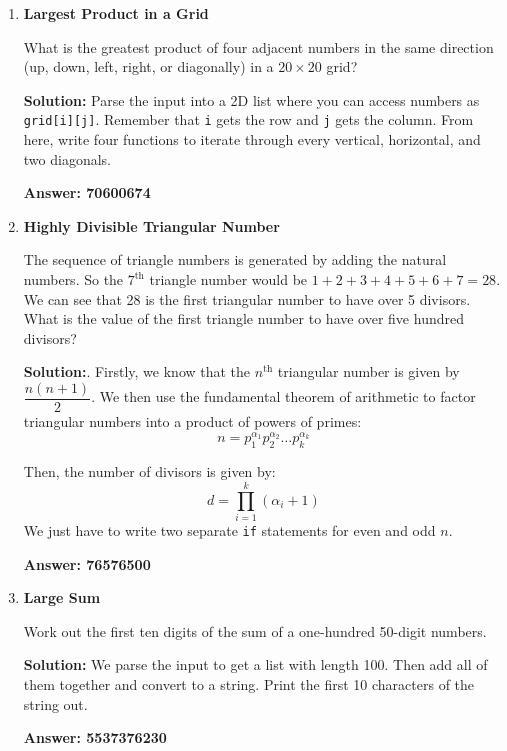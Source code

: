 \documentclass[12pt]{article}
\begin{document}
\begin{enumerate}
    \item \textbf{Largest Product in a Grid}
    \par What is the greatest product of four adjacent numbers in the same direction (up, down, left, right, or diagonally) in a $20 \times 20$ grid?
    \par \textbf{Solution:} Parse the input into a 2D list where you can access numbers as \texttt{grid[i][j]}. Remember that \texttt{i} gets the row and \texttt{j} gets the column. From here, write four functions to iterate through every vertical, horizontal, and two diagonals.

    \par \textbf{Answer: 70600674}

    \item \textbf{Highly Divisible Triangular Number}
    \par The sequence of triangle numbers is generated by adding the natural numbers. So the $7^\text{th}$ triangle number would be $1+2+3+4+5+6+7=28$. We can see that 28 is the first triangular number to have over 5 divisors. What is the value of the first triangle number to have over five hundred divisors?

    \par \textbf{Solution:}. Firstly, we know that the $n^\text{th}$ triangular number is given by $\dfrac{n(n+1)}{2}$. We then use the fundamental theorem of arithmetic to factor triangular numbers into a product of powers of primes:
    \begin{equation*}
        n = p_{1}^{\alpha_1}p_{2}^{\alpha_2}\ldots p_{k}^{\alpha_k}
    \end{equation*}
    \par Then, the number of divisors is given by:
    \begin{equation*}
        d = \prod_{i=1}^k (\alpha_i + 1)
    \end{equation*}
    We just have to write two separate \texttt{if} statements for even and odd $n$.
    \par \textbf{Answer: 76576500}

    \item \textbf{Large Sum}
    \par Work out the first ten digits of the sum of a one-hundred 50-digit numbers.
    \par \textbf{Solution:} We parse the input to get a list with length 100. Then add all of them together and convert to a string. Print the first 10 characters of the string out.
    \par \textbf{Answer: 5537376230}


\end{enumerate}
\end{document}
